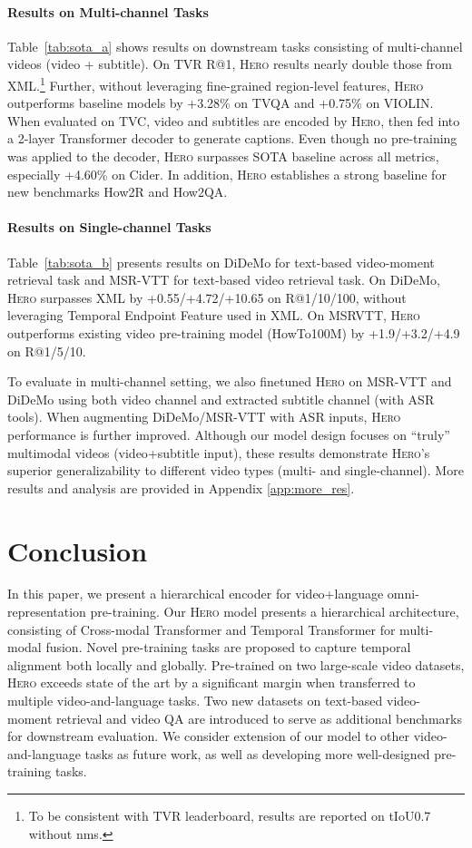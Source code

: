 \documentclass[11pt,a4paper]{article}
\begin{document}
\paragraph{Results on Multi-channel Tasks}
Table~\ref{tab:sota_a} shows  results on downstream tasks consisting of multi-channel videos (video + subtitle). On TVR R@1, \textsc{Hero} results nearly double those from XML.\footnote{\label{note:tvr_test}To be consistent with TVR leaderboard, results are reported on tIoU0.7 without nms.}  Further, without leveraging fine-grained region-level features, \textsc{Hero} outperforms baseline models by +3.28\% on TVQA and +0.75\% on VIOLIN. When evaluated on TVC, video and subtitles are encoded by \textsc{Hero}, then fed into a 2-layer Transformer decoder to generate captions. Even though no pre-training was applied to the decoder, \textsc{Hero} surpasses SOTA baseline across all metrics, especially +4.60\% on Cider. In addition, \textsc{Hero} establishes a strong baseline for new benchmarks How2R and How2QA. 

\paragraph{Results on Single-channel Tasks}
Table~\ref{tab:sota_b} presents results on DiDeMo for text-based video-moment retrieval task and MSR-VTT for text-based video retrieval task. On DiDeMo, \textsc{Hero} surpasses XML by +0.55/+4.72/+10.65 on R@1/10/100, without leveraging Temporal Endpoint Feature used in XML. On MSRVTT, \textsc{Hero} outperforms existing video pre-training model (HowTo100M) by +1.9/+3.2/+4.9 on R@1/5/10. 

To evaluate in multi-channel setting, we also finetuned \textsc{Hero} on MSR-VTT and DiDeMo using both video channel and extracted subtitle channel (with ASR tools). When augmenting DiDeMo/MSR-VTT with ASR inputs, \textsc{Hero} performance is further improved. Although our model design focuses on “truly” multimodal videos (video+subtitle input), these results demonstrate \textsc{Hero}’s superior generalizability to different video types (multi- and single-channel). More results and analysis are provided in Appendix \ref{app:more_res}.


\section{Conclusion}
In this paper, we present a hierarchical encoder for video+language omni-representation pre-training.
Our \textsc{Hero} model presents a hierarchical architecture, consisting of Cross-modal Transformer and Temporal Transformer for multi-modal fusion.
Novel pre-training tasks are proposed to capture temporal alignment both locally and globally.
Pre-trained on two large-scale video datasets, \textsc{Hero} exceeds state of the art by a significant margin when transferred to multiple video-and-language tasks. Two new datasets on text-based video-moment retrieval and video QA are introduced to serve as additional benchmarks for downstream evaluation.
We consider extension of our model to other video-and-language tasks as future work, as well as developing more well-designed pre-training tasks. 


\end{document}
